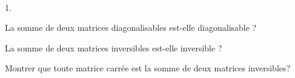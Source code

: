 \documentclass[11pt]{article}%
\begin{document}

\begin{exerciceSP}~
  \begin{noliste}{1.}
    \setlength{\itemsep}{2mm}
  \item La somme de deux matrices diagonalisables est-elle
    diagonalisable ?
  \item La somme de deux matrices inversibles est-elle inversible ?
  \item Montrer que toute matrice carrée est la somme de deux matrices
    inversibles?
  \end{noliste}
\end{exerciceSP}


\newpage


\end{document}
